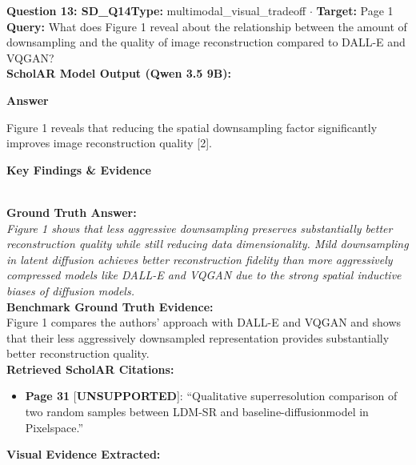 \documentclass[10pt,a4paper]{article}
\begin{document}
\vspace{4pt}
\begin{tcolorbox}[questionbox]
{\noindent\bfseries\large\color{navy} Question 13: SD\_Q14}\hfill {\footnotesize\color{darkteal}\textbf{Type:} multimodal\_visual\_tradeoff $\cdot$ \textbf{Target:} Page 1}\\[4pt]
{\noindent\bfseries\color{accentblue} Query: } What does Figure 1 reveal about the relationship between the amount of downsampling and the quality of image reconstruction compared to DALL-E and VQGAN?\\[6pt]
{\noindent\bfseries\color{navy} ScholAR Model Output (Qwen 3.5 9B):}\\[2pt]
{\small \noindent \textbf{Answer}\par\vspace{3pt}Figure 1 reveals that reducing the spatial downsampling factor significantly improves image reconstruction quality [2].\par\vspace{3pt}\noindent \textbf{Key Findings \& Evidence}}\\[6pt]
{\noindent\bfseries\color{darkteal} Ground Truth Answer:}\\[2pt]
{\small\itshape Figure 1 shows that less aggressive downsampling preserves substantially better reconstruction quality while still reducing data dimensionality. Mild downsampling in latent diffusion achieves better reconstruction fidelity than more aggressively compressed models like DALL-E and VQGAN due to the strong spatial inductive biases of diffusion models.}\\[4pt]
{\noindent\bfseries\color{darkteal} Benchmark Ground Truth Evidence:}\\[2pt]
{\footnotesize Figure 1 compares the authors' approach with DALL-E and VQGAN and shows that their less aggressively downsampled representation provides substantially better reconstruction quality.}\\[4pt]
{\noindent\bfseries\color{navy} Retrieved ScholAR Citations:}\\[2pt]
\begin{itemize}\setlength\itemsep{1pt}
\item {\footnotesize \textbf{Page 31} [{\color{gold}\textbf{UNSUPPORTED}}]: ``Qualitative superresolution comparison of two random samples between LDM-SR and baseline-diffusionmodel in Pixelspace.''}
\end{itemize}
\vspace{4pt}
{\noindent\bfseries\color{navy} Visual Evidence Extracted:}\\[4pt]

\end{tcolorbox}
\end{document}
